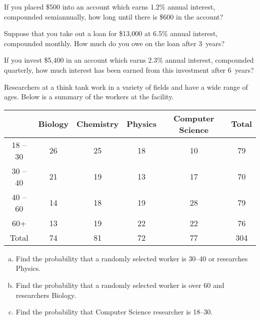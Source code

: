 \documentclass[12pt,letterpaper]{exam}
\begin{document}
\begin{questions}
\newpage
\question[10] If you placed \$500 into an account which earns 1.2\% annual interest, compounded semiannually, how long until there is \$600 in the account? 



\newpage
\question[10] Suppose that you take out a loan for \$13,000 at 6.5\% annual interest, compounded monthly. How much do you owe on the loan after 3~years?



\newpage
\question[10] If you invest \$5,400 in an account which earns 2.3\% annual interest, compounded quarterly, how much interest has been earned from this investment after 6~years?



\newpage
\question[10] Researchers at a think tank work in a variety of fields and have a wide range of ages. Below is a summary of the workers at the facility. \par
	\begin{table}[!ht]
	\centering
	\begin{tabular}{|c||c|c|c|c||c|} \hline
	& Biology & Chemistry & Physics & Computer Science & Total \\ \hline
	18 -- 30 & 26 & 25 & 18 & 10 & 79 \\ \hline
	30 -- 40 & 21 & 19 & 13 & 17 & 70 \\ \hline 
	40 -- 60 & 14 & 18 & 19 & 28 & 79 \\ \hline
	60+ & 13 & 19 & 22 & 22 & 76 \\ \hline \hline
	Total & 74 & 81 & 72 & 77 & 304 \\ \hline
	\end{tabular}
	\end{table} \par

\begin{enumerate}[(a)]
\item Find the probability that a randomly selected worker is 30--40 or researches Physics.
\item Find the probability that a randomly selected worker is over 60 and researchers Biology.
\item Find the probability that Computer Science researcher is 18--30. 
\end{enumerate}




\end{questions}
\end{document}

